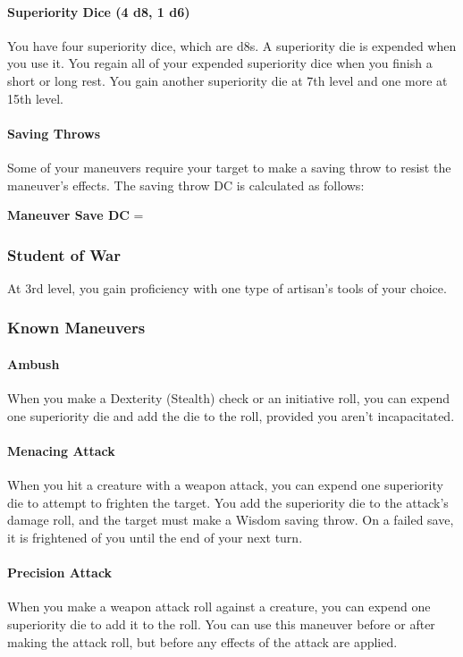 {\paragraph*{Superiority Dice (4 d8, 1 d6)} You have four superiority dice, which are d8s. A superiority die is expended when you use it. You regain all of your expended superiority dice when you finish a short or long rest. You gain another superiority die at 7th level and one more at 15th level.

\paragraph*{Saving Throws} Some of your maneuvers require your target to make a saving throw to resist the maneuver's effects. The saving throw DC is calculated as follows:

\textbf{Maneuver Save DC} = 
\subsubsection*{Student of War}
At 3rd level, you gain proficiency with one type of artisan's tools of your choice.
\subsubsection*{Known Maneuvers}
\paragraph*{Ambush}
When you make a Dexterity (Stealth) check or an initiative roll, you can expend one superiority die and add the die to the roll, provided you aren't incapacitated.
\paragraph*{Menacing Attack}
When you hit a creature with a weapon attack, you can expend one superiority die to attempt to frighten the target. You add the superiority die to the attack's damage roll, and the target must make a Wisdom saving throw. On a failed save, it is frightened of you until the end of your next turn.
\paragraph*{Precision Attack}
When you make a weapon attack roll against a creature, you can expend one superiority die to add it to the roll. You can use this maneuver before or after making the attack roll, but before any effects of the attack are applied.
}

